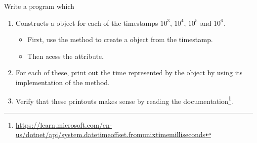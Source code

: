 Write a program which
\begin{enumerate}
  \item Constructs a  object for each of the timestamps $10^3$, $10^4$, $10^5$ and $10^6$.
    \begin{itemize}
      \item First, use the  method to create a  object from the timestamp.
      \item Then acess the  attribute.
    \end{itemize}
  \item For each of these, print out the time represented by the object by using its implementation of the  method.
  \item Verify that these printouts makes sense by reading the documentation\footnote{\url{https://learn.microsoft.com/en-us/dotnet/api/system.datetimeoffset.fromunixtimemilliseconds}}.
\end{enumerate}

